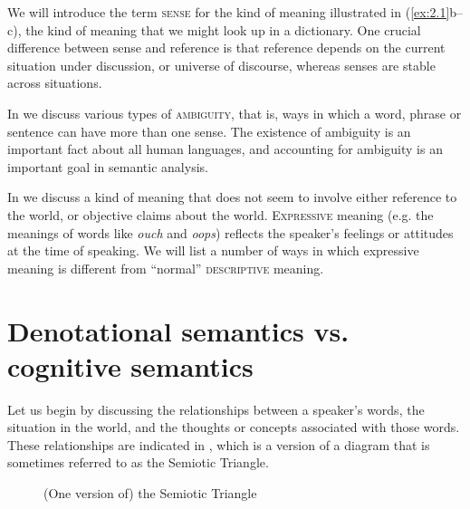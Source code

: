 We will introduce the term \textsc{sense} for the kind of meaning illustrated in (\ref{ex:2.1}b--c), the kind of meaning that we might look up in a dictionary. One crucial difference between sense and reference is that reference depends on the current situation under discussion, or universe of discourse, whereas senses are stable across situations.



In  we discuss various types of \textsc{ambiguity}, that is, ways in which a word, phrase or sentence can have more than one sense. The existence of ambiguity is an important fact about all human languages, and accounting for ambiguity is an important goal in semantic analysis.



In  we discuss a kind of meaning that does not seem to involve either reference to the world, or objective claims about the world. \textsc{Expressive} meaning (e.g. the meanings of words like \textit{ouch} and \textit{oops}) reflects the speaker’s feelings or attitudes at the time of speaking. We will list a number of ways in which expressive meaning is different from “normal” \textsc{descriptive} meaning.


\section{Denotational semantics vs. cognitive semantics}\label{sec:2.2}

Let us begin by discussing the relationships between a speaker’s words, the situation in the world, and the thoughts or concepts associated with those words. These relationships are indicated in , which is a version of a diagram that is sometimes referred to as the Semiotic Triangle.


\begin{figure}
\caption{\label{ex:2.2}(One version of) the Semiotic Triangle}
\end{figure}


